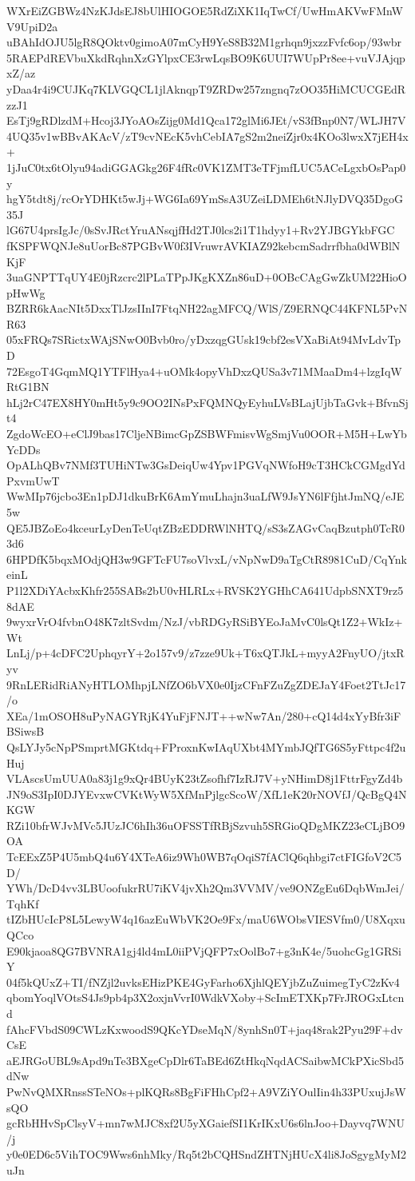 WXrEiZGBWz4NzKJdsEJ8bUlHIOGOE5RdZiXK1IqTwCf/UwHmAKVwFMnWV9UpiD2a
uBAhIdOJU5lgR8QOktv0gimoA07mCyH9YeS8B32M1grhqn9jxzzFvfc6op/93wbr
5RAEPdREVbuXkdRqhnXzGYlpxCE3rwLqsBO9K6UUI7WUpPr8ee+vuVJAjqpxZ/az
yDaa4r4i9CUJKq7KLVGQCL1jlAknqpT9ZRDw257zngnq7zOO35HiMCUCGEdRzzJ1
EsTj9gRDlzdM+Hcoj3JYoAOsZijg0Md1Qca172glMi6JEt/vS3fBnp0N7/WLJH7V
4UQ35v1wBBvAKAcV/zT9cvNEcK5vhCebIA7gS2m2neiZjr0x4KOo3lwxX7jEH4x+
1jJuC0tx6tOlyu94adiGGAGkg26F4fRc0VK1ZMT3eTFjmfLUC5ACeLgxbOsPap0y
hgY5tdt8j/rcOrYDHKt5wJj+WG6Ia69YmSsA3UZeiLDMEh6tNJlyDVQ35DgoG35J
lG67U4prsIgJc/0sSvJRctYruANsqjfHd2TJ0lcs2i1T1hdyy1+Rv2YJBGYkbFGC
fKSPFWQNJe8uUorBc87PGBvW0f3IVruwrAVKIAZ92kebcmSadrrfbha0dWBlNKjF
3uaGNPTTqUY4E0jRzcrc2lPLaTPpJKgKXZn86uD+0OBcCAgGwZkUM22HioOpHwWg
BZRR6kAacNIt5DxxTlJzsIInI7FtqNH22agMFCQ/WlS/Z9ERNQC44KFNL5PvNR63
05xFRQs7SRictxWAjSNwO0Bvb0ro/yDxzqgGUsk19cbf2esVXaBiAt94MvLdvTpD
72EsgoT4GqmMQ1YTFlHya4+uOMk4opyVhDxzQUSa3v71MMaaDm4+lzgIqWRtG1BN
hLj2rC47EX8HY0mHt5y9c9OO2INsPxFQMNQyEyhuLVsBLajUjbTaGvk+BfvnSjt4
ZgdoWcEO+eClJ9bas17CljeNBimcGpZSBWFmisvWgSmjVu0OOR+M5H+LwYbYcDDs
OpALhQBv7NMf3TUHiNTw3GsDeiqUw4Ypv1PGVqNWfoH9cT3HCkCGMgdYdPxvmUwT
WwMIp76jcbo3En1pDJ1dkuBrK6AmYmuLhajn3uaLfW9JsYN6lFfjhtJmNQ/eJE5w
QE5JBZoEo4kceurLyDenTeUqtZBzEDDRWlNHTQ/sS3sZAGvCaqBzutph0TcR03d6
6HPDfK5bqxMOdjQH3w9GFTcFU7soVlvxL/vNpNwD9aTgCtR8981CuD/CqYnkeinL
P1l2XDiYAcbxKhfr255SABs2bU0vHLRLx+RVSK2YGHhCA641UdpbSNXT9rz58dAE
9wyxrVrO4fvbnO48K7zltSvdm/NzJ/vbRDGyRSiBYEoJaMvC0lsQt1Z2+WkIz+Wt
LnLj/p+4cDFC2UphqyrY+2o157v9/z7zze9Uk+T6xQTJkL+myyA2FnyUO/jtxRyv
9RnLERidRiANyHTLOMhpjLNfZO6bVX0e0IjzCFnFZuZgZDEJaY4Foet2TtJc17/o
XEa/1mOSOH8uPyNAGYRjK4YuFjFNJT++wNw7An/280+cQ14d4xYyBfr3iFBSiwsB
QsLYJy5cNpPSmprtMGKtdq+FProxnKwIAqUXbt4MYmbJQfTG6S5yFttpc4f2uHuj
VLAscsUmUUA0a83j1g9xQr4BUyK23tZsofhf7IzRJ7V+yNHimD8j1FttrFgyZd4b
JN9oS3IpI0DJYEvxwCVKtWyW5XfMnPjlgcScoW/XfL1eK20rNOVfJ/QcBgQ4NKGW
RZi10bfrWJvMVc5JUzJC6hIh36uOFSSTfRBjSzvuh5SRGioQDgMKZ23eCLjBO9OA
TcEExZ5P4U5mbQ4u6Y4XTeA6iz9Wh0WB7qOqiS7fAClQ6qhbgi7ctFIGfoV2C5D/
YWh/DcD4vv3LBUoofukrRU7iKV4jvXh2Qm3VVMV/ve9ONZgEu6DqbWmJei/TqhKf
tIZbHUcIcP8L5LewyW4q16azEuWbVK2Oe9Fx/maU6WObsVIESVfm0/U8XqxuQCco
E90kjaoa8QG7BVNRA1gj4ld4mL0iiPVjQFP7xOolBo7+g3nK4e/5uohcGg1GRSiY
04f5kQUxZ+TI/fNZjl2uvksEHizPKE4GyFarho6XjhlQEYjbZuZuimegTyC2zKv4
qbomYoqlVOtsS4Js9pb4p3X2oxjnVvrI0WdkVXoby+ScImETXKp7FrJROGxLtcnd
fAhcFVbdS09CWLzKxwoodS9QKcYDseMqN/8ynhSn0T+jaq48rak2Pyu29F+dvCsE
aEJRGoUBL9sApd9nTe3BXgeCpDlr6TaBEd6ZtHkqNqdACSaibwMCkPXicSbd5dNw
PwNvQMXRnssSTeNOs+plKQRs8BgFiFHhCpf2+A9VZiYOulIin4h33PUxujJsWsQO
gcRbHHvSpClsyV+mn7wMJC8xf2U5yXGaiefSI1KrIKxU6s6lnJoo+Dayvq7WNU/j
y0e0ED6c5VihTOC9Wws6nhMky/Rq5t2bCQHSndZHTNjHUcX4li8JoSgygMyM2uJn

